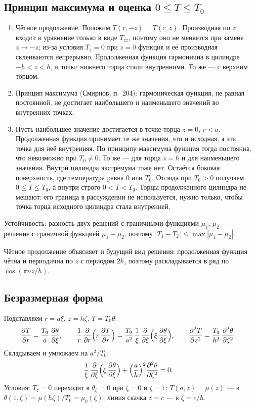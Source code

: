 \documentclass[a4paper,12pt]{article}
\renewcommand{\le}{\leqslant}
\newcommand{\pd}[2]{\dfrac{\partial #1}{\partial #2}}
\newcommand{\pdd}[2]{\dfrac{\partial^2 #1}{\partial #2^2}}
\begin{document}
\subsection{Принцип максимума и оценка $0\le T\le T_0$}
\label{der:max}
\begin{enumerate}
  \item Чётное продолжение. Положим $T(r,-z)=T(r,z)$. Производная по $z$
  входит в уравнение только в виде $T_{zz}$, поэтому оно не меняется при
  замене $z\to-z$; из-за условия $T_z=0$ при $z=0$ функция и её производная
  склеиваются непрерывно. Продолженная функция гармонична в цилиндре
  $-h<z<h$, и точки нижнего торца стали внутренними. То же — с верхним
  торцом.
  \item Принцип максимума (Смирнов, п.~204): гармоническая функция, не
  равная постоянной, не достигает наибольшего и наименьшего значений во
  внутренних точках.
  \item Пусть наибольшее значение достигается в точке торца $z=0$, $r<a$.
  Продолженная функция принимает те же значения, что и исходная, а эта
  точка для неё внутренняя. По принципу максимума функция тогда постоянна,
  что невозможно при $T_0\ne0$. То же — для торца $z=h$ и для наименьшего
  значения. Внутри цилиндра экстремума тоже нет. Остаётся боковая
  поверхность, где температура равна 0 или $T_0$. Отсюда при $T_0>0$
  получаем $0\le T\le T_0$, а внутри строго $0<T<T_0$. Торцы продолженного
  цилиндра не мешают: его граница в рассуждении не используется, нужно
  только, чтобы точка торца исходного цилиндра стала внутренней.
\end{enumerate}
Устойчивость: разность двух решений с граничными функциями $\mu_1$, $\mu_2$
— решение с граничной функцией $\mu_1-\mu_2$, поэтому
$|T_1-T_2|\le\max|\mu_1-\mu_2|$.

Чётное продолжение объясняет и будущий вид решения: продолженная функция
чётна и периодична по $z$ с периодом $2h$, поэтому раскладывается в ряд по
$\cos(\pi nz/h)$.

\subsection{Безразмерная форма}
\label{der:dimless}
Подставляем $r=a\xi$, $z=h\zeta$, $T=T_0\theta$:
\[
\pd{T}{r}=\frac{T_0}{a}\,\pd{\theta}{\xi},\qquad
\frac1r\,\pd{}{r}\Bigl(r\,\pd{T}{r}\Bigr)
=\frac{T_0}{a^2}\,\frac1\xi\,\pd{}{\xi}\Bigl(\xi\,\pd{\theta}{\xi}\Bigr),\qquad
\pdd{T}{z}=\frac{T_0}{h^2}\,\pdd{\theta}{\zeta}.
\]
Складываем и умножаем на $a^2/T_0$:
\[
\frac1\xi\,\pd{}{\xi}\Bigl(\xi\,\pd{\theta}{\xi}\Bigr)
+\Bigl(\frac{a}{h}\Bigr)^2\pdd{\theta}{\zeta}=0 .
\]
Условия: $T_z=0$ переходит в $\theta_\zeta=0$ при $\zeta=0$ и $\zeta=1$;
$T(a,z)=\mu(z)$ — в $\theta(1,\zeta)=\mu(h\zeta)/T_0=\mu_0(\zeta)$; линия
скачка $z=c$ — в $\zeta=c/h$.
\end{document}
